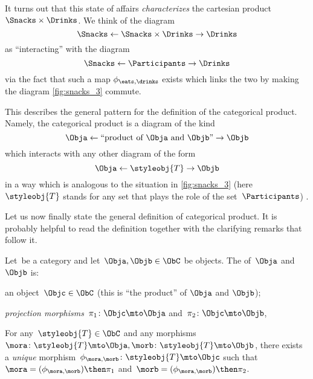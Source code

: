 It turns out that this state of affairs \emph{characterizes} the cartesian product $\Snacks\times \Drinks$. We think of the diagram
\begin{equation}\label{eq:snacks-prod-diagram}
\Snacks \leftarrow \Snacks \times \Drinks \rightarrow \Drinks
\end{equation}
as ``interacting'' with the diagram
\begin{equation}\label{eq:snacks-prod-test-diagram}
\Snacks \leftarrow \Participants \rightarrow \Drinks
\end{equation}
via the fact that such a map $\phi_{\eats,\drinks}$ exists which links the two by making the diagram \cref{fig:snacks_3} commute.

This describes the general pattern for the definition of the categorical product. Namely, the categorical product is a diagram of the kind
\begin{equation}\label{eq:prod-inline-generic-diagram}
\Obja \leftarrow \text{``product of } \Obja \text{ and } \Objb \text{''}  \rightarrow \Objb
\end{equation}
which interacts with any other diagram of the form
\begin{equation}\label{eq:prod-inline-test-diagram}
\Obja \leftarrow \styleobj{T} \rightarrow \Objb
\end{equation}
in a way which is analogous to the situation in \cref{fig:snacks_3} (here~$\styleobj{T}$ stands for any set that plays the role of the set~$\Participants$) .

Let us now finally state the general definition of categorical product. It is probably helpful to read the definition together with the clarifying remarks that follow it.


\begin{ctdefinition}\label{def:categorical-product}
  Let~\CatC be a category and let~$\Obja, \Objb \in \ObC$ be objects. The \emph{} of~$\Obja$ and~$\Objb$ is: \\
  \constit
  \begin{compactenum}
    \item an object~$\Objc \in \ObC$ (this is ``the product'' of $\Obja$  and $\Objb$);
    \item \emph{projection morphisms}~$\pi_1 \colon \Objc \mto \Obja$ and~$\pi_2 \colon \Objc \mto \Objb$,
  \end{compactenum}
  \condit
  \begin{compactenum}
    \item For any~$\styleobj{T} \in \ObC$ and any morphisms~$\mora \colon \styleobj{T} \mto \Obja, \morb \colon \styleobj{T} \mto \Objb$, there exists a \emph{unique} morphism~$\phi_{\mora,\morb} \colon \styleobj{T} \mto \Objc$ such that~$\mora = (\phi_{\mora,
      \morb})\then \pi_1$ and~$\morb=(\phi_{\mora, \morb})\then \pi_2$.
  \end{compactenum}
\end{ctdefinition}

